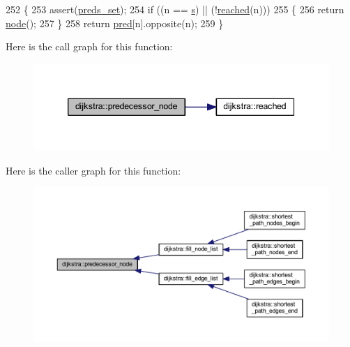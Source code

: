 \begin{DoxyCode}
252 \{
253     assert(\mbox{\hyperlink{classdijkstra_aaba530e703b5d4005b3c01fa1a11182d}{preds\_set}});
254     \textcolor{keywordflow}{if} ((n == \mbox{\hyperlink{classdijkstra_a721bfb648626a1be2b9d276d85ebdb9d}{s}}) || (!\mbox{\hyperlink{classdijkstra_a405ff80abfc9ad98668534032eed6a5b}{reached}}(n)))
255     \{
256     \textcolor{keywordflow}{return} \mbox{\hyperlink{classnode}{node}}();
257     \}
258     \textcolor{keywordflow}{return} \mbox{\hyperlink{classdijkstra_a662d982b45b2992ecf7b7f7e6696f9f9}{pred}}[n].opposite(n);
259 \}
\end{DoxyCode}
Here is the call graph for this function\+:\nopagebreak
\begin{figure}[H]
\begin{center}
\leavevmode
\includegraphics[width=339pt]{classdijkstra_a99c17ee7c2b55574ea8c2952fac09faf_cgraph}
\end{center}
\end{figure}
Here is the caller graph for this function\+:\nopagebreak
\begin{figure}[H]
\begin{center}
\leavevmode
\includegraphics[width=350pt]{classdijkstra_a99c17ee7c2b55574ea8c2952fac09faf_icgraph}
\end{center}
\end{figure}
\mbox{\label{classdijkstra_a405ff80abfc9ad98668534032eed6a5b}} 

